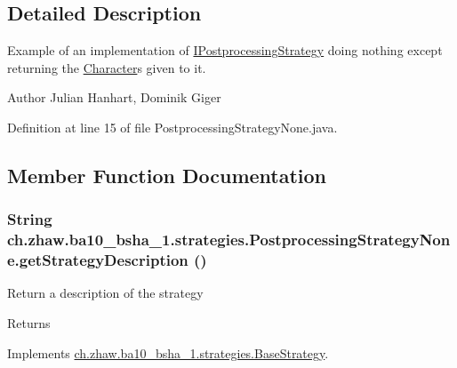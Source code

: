 \subsection{Detailed Description}
Example of an implementation of \hyperlink{interfacech_1_1zhaw_1_1ba10__bsha__1_1_1strategies_1_1IPostprocessingStrategy}{IPostprocessingStrategy} doing nothing except returning the \hyperlink{classch_1_1zhaw_1_1ba10__bsha__1_1_1Character}{Character}s given to it.

\begin{DoxyAuthor}{Author}
Julian Hanhart, Dominik Giger 
\end{DoxyAuthor}


Definition at line 15 of file PostprocessingStrategyNone.java.

\subsection{Member Function Documentation}
\hypertarget{classch_1_1zhaw_1_1ba10__bsha__1_1_1strategies_1_1PostprocessingStrategyNone_aa6732900e4c07b57f238da6134c8405a}{
\subsubsection[{getStrategyDescription}]{\setlength{\rightskip}{0pt plus 5cm}String ch.zhaw.ba10\_\-bsha\_\-1.strategies.PostprocessingStrategyNone.getStrategyDescription ()}}
\label{classch_1_1zhaw_1_1ba10__bsha__1_1_1strategies_1_1PostprocessingStrategyNone_aa6732900e4c07b57f238da6134c8405a}
Return a description of the strategy

\begin{DoxyReturn}{Returns}

\end{DoxyReturn}


Implements \hyperlink{classch_1_1zhaw_1_1ba10__bsha__1_1_1strategies_1_1BaseStrategy_a75fdb36932ad701f6375cc1fe718056b}{ch.zhaw.ba10\_\-bsha\_\-1.strategies.BaseStrategy}.

